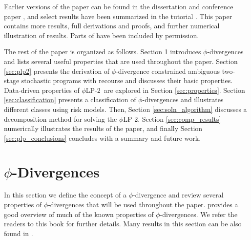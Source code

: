 \documentclass[opre,nonblindrev]{informs3} %
\newcommand{\plp}{$\phi$LP-2}
\begin{document}
Earlier versions of the paper can be found in the dissertation \cite{love_13} and conference paper \cite{love2014classification}, and select results have been summarized in the tutorial \cite{bayraksan_love_15}. 
This paper contains more results, full derivations and proofs, and further numerical illustration of results.  
Parts of \cite{bayraksan_love_15} have been included by permission. 


The rest of the paper is organized as follows.
Section \ref{sec:phi_divergences} introduces $\phi$-divergences and lists several useful properties that are used throughout the paper.
Section \ref{sec:plp2} presents the derivation of $\phi$-divergence constrained ambiguous two-stage stochastic programs with recourse and discusses their basic properties. %
Data-driven properties of \plp\ are explored in Section \ref{sec:properties}. 
Section \ref{sec:classification} presents a classification of $\phi$-divergences and illustrates different classes using risk models. 
Then, Section \ref{sec:soln_algorithm} discusses a decomposition method for solving the \plp. 
Section \ref{sec:comp_results} numerically illustrates the results of the paper, and finally
Section \ref{sec:plp_conclusions} concludes with a summary and future work.


\section{$\phi$-Divergences} %
\label{sec:phi_divergences}

In this section we define the concept of a $\phi$-divergence and review several properties of  $\phi$-divergences that will be used throughout the paper. 
\citet{pardo2005statistical} provides a good overview of much of the known properties of $\phi$-divergences. 
We refer the readers to this book for further details.
Many results in this section can be also found in \cite{bental1991certainty,bental2013robust}.
\end{document}
